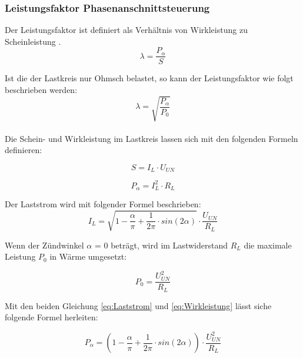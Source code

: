 \subsubsection{Leistungsfaktor Phasenanschnittsteuerung}\label{sec:Leistungsfaktor_Phasenanschnittsteuerung}
Der Leistungsfaktor ist definiert als Verhältnis von Wirkleistung zu Scheinleistung \cite{Leistungselektronik}. 
\begin{equation}\label{eq:lamda_p}
\lambda = \frac{P_{\alpha}}{S}
\end{equation}

Ist die der Lastkreis nur Ohmsch belastet, so kann der Leistungsfaktor wie folgt beschrieben werden:
\begin{equation}\label{eq:lamda_ohmisch belastet}
\lambda =\sqrt{\frac{P_{\alpha}}{P_{0}}} 
\end{equation}
\\
Die Schein- und Wirkleistung im Lastkreis lassen sich mit den folgenden Formeln definieren:

\begin{equation}\label{eq:Scheinleistung}
S = I_L \cdot U_{UN}   
\end{equation}

\begin{equation}\label{eq:Wirkleistung}
 P_{\alpha} = I_L^2 \cdot R_L    
\end{equation}

Der Laststrom wird mit folgender Formel beschrieben:
\begin{equation}\label{eq:Laststrom}
I_L = \sqrt{1-\frac{\alpha}{\pi}+\frac{1}{2\pi} \cdot sin(2\alpha)} \cdot \frac{U_{UN}}{R_L}
\end{equation}

Wenn der Zündwinkel $\alpha$ = 0 beträgt, wird im Lastwiderstand $R_L$ die maximale Leistung $P_0$ in Wärme umgesetzt:

\begin{equation}\label{eq:Wirkleistung_bei_maximaler_alpha=0}
P_{0} = \frac{ U_{UN}^2}{R_L}  
\end{equation}

Mit den beiden Gleichung \ref{eq:Laststrom} und \ref{eq:Wirkleistung} lässt siche folgende Formel herleiten:

\begin{equation}\label{eq:p_alpha_neu}
P_{\alpha} = \left(1-\frac{\alpha}{\pi}+\frac{1}{2\pi} \cdot sin(2\alpha)\right)  \cdot \frac{U_{UN}^2}{R_L}
\end{equation}
 

